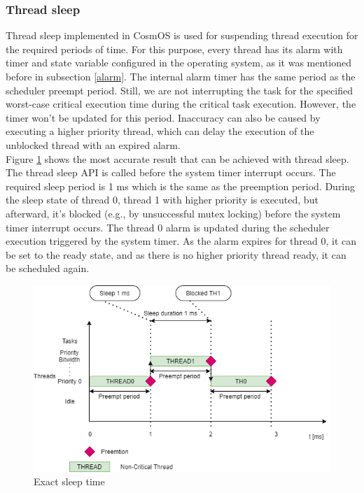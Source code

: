 \subsubsection{Thread sleep}
Thread sleep implemented in CosmOS is used for suspending thread execution for the required periods of time. For this purpose, every thread has its alarm with timer and state variable configured in the operating system, as it was mentioned before in subsection \ref{alarm}. The internal alarm timer has the same period as the scheduler preempt period. Still, we are not interrupting the task for the specified worst-case critical execution time during the critical task execution. However, the timer won't be updated for this period. Inaccuracy can also be caused by executing a higher priority thread, which can delay the execution of the unblocked thread with an expired alarm. \\
\indent Figure \ref{fig:exactSleepTime} shows the most accurate result that can be achieved with thread sleep. The thread sleep \ac{API} is called before the system timer interrupt occurs. The required sleep period is 1 ms which is the same as the preemption period. During the sleep state of thread 0, thread 1 with higher priority is executed, but afterward, it's blocked (e.g., by unsuccessful mutex locking) before the system timer interrupt occurs. The thread 0 alarm is updated during the scheduler execution triggered by the system timer. As the alarm expires for thread 0, it can be set to the ready state, and as there is no higher priority thread ready, it can be scheduled again.
\begin{figure}[H]
\begin{center}
\includegraphics[width=1\textwidth]{images/thread_sleep_exact.png}
\caption{Exact sleep time}
\label{fig:exactSleepTime}
\end{center}
\end{figure}

